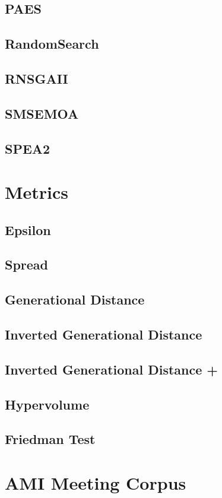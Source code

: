 \subsection{PAES}
\subsection{RandomSearch}
\subsection{RNSGAII}
\subsection{SMSEMOA}
\subsection{SPEA2}

\section{Metrics}

\subsection{Epsilon}
\subsection{Spread}
\subsection{Generational Distance}
\subsection{Inverted Generational Distance}
\subsection{Inverted Generational Distance +}
\subsection{Hypervolume}
\subsection{Friedman Test}

\section{AMI Meeting Corpus}


